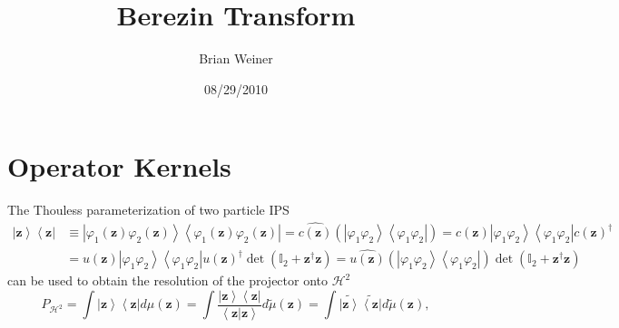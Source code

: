 \documentclass[aps,preprint]{revtex4}%
\begin{document}
\preprint{ }
\title{Berezin Transform}
\author{Brian Weiner}

\begin{abstract}


\end{abstract}
\date{08/29/2010}
\maketitle
\tableofcontents


\section{Operator Kernels}

The Thouless parameterization of two particle IPS\
\begin{align}
\left\vert \mathbf{z}\right\rangle \left\langle \mathbf{z}\right\vert  &
\equiv\left\vert \varphi_{1}\left(  \mathbf{z}\right)  \varphi_{2}\left(
\mathbf{z}\right)  \right\rangle \left\langle \varphi_{1}\left(
\mathbf{z}\right)  \varphi_{2}\left(  \mathbf{z}\right)  \right\vert
=\widehat{c\left(  \mathbf{z}\right)  }\left(  \left\vert \varphi_{1}%
\varphi_{2}\right\rangle \left\langle \varphi_{1}\varphi_{2}\right\vert
\right)  =c\left(  \mathbf{z}\right)  \left\vert \varphi_{1}\varphi
_{2}\right\rangle \left\langle \varphi_{1}\varphi_{2}\right\vert c\left(
\mathbf{z}\right)  ^{\dagger}\nonumber\\
&  =u\left(  \mathbf{z}\right)  \left\vert \varphi_{1}\varphi_{2}\right\rangle
\left\langle \varphi_{1}\varphi_{2}\right\vert u\left(  \mathbf{z}\right)
^{\dagger}\det\left(  \mathbb{I}_{2}+\mathbf{z}^{\dagger}\mathbf{z}\right)
=\widehat{u\left(  \mathbf{z}\right)  }\left(  \left\vert \varphi_{1}%
\varphi_{2}\right\rangle \left\langle \varphi_{1}\varphi_{2}\right\vert
\right)  \det\left(  \mathbb{I}_{2}+\mathbf{z}^{\dagger}\mathbf{z}\right)
\end{align}
can be used to obtain the resolution of the projector onto $\mathcal{H}^{2}$
\begin{equation}
P_{\mathcal{H}^{2}}=\int\left\vert \mathbf{z}\right\rangle \left\langle
\mathbf{z}\right\vert d\mu\left(  \mathbf{z}\right)  =\int\frac{\left\vert
\mathbf{z}\right\rangle \left\langle \mathbf{z}\right\vert }{\left\langle
\mathbf{z}\left\vert \mathbf{z}\right.  \right\rangle }d\tilde{\mu}\left(
\mathbf{z}\right)  =\int\widetilde{\left\vert \mathbf{z}\right\rangle
}\widetilde{\left\langle \mathbf{z}\right\vert }d\tilde{\mu}\left(
\mathbf{z}\right)  ,
\end{equation}
\end{document}
